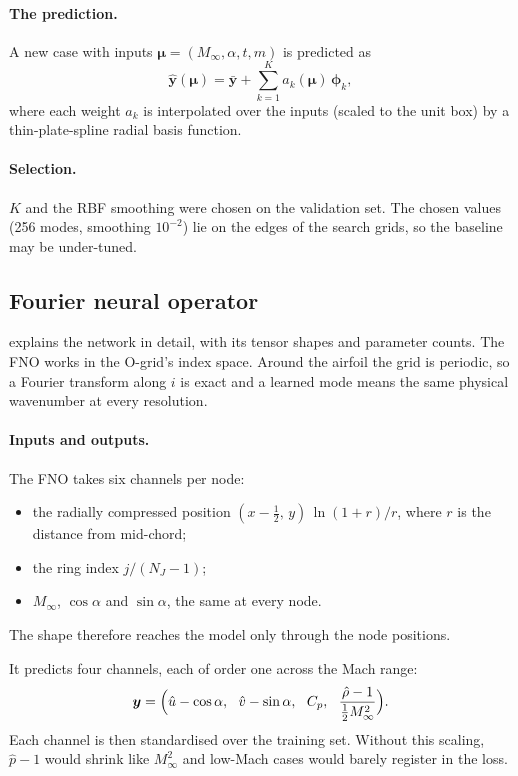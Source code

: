 \documentclass[11pt]{article}
\newcommand{\Ma}{M_\infty}
\newcommand{\Cp}{C_p}
\begin{document}
\paragraph{The prediction.}
A new case with inputs $\bm\mu = (\Ma,\alpha,t,m)$ is predicted as
\begin{equation}
  \hat{\bm y}(\bm\mu) = \bar{\bm y} + \sum_{k=1}^{K} a_k(\bm\mu)\,\bm\phi_k ,
\end{equation}
where each weight $a_k$ is interpolated over the inputs (scaled to the unit box) by a
thin-plate-spline radial basis function.

\paragraph{Selection.}
$K$ and the RBF smoothing were chosen on the validation set. The chosen values (256 modes,
smoothing $10^{-2}$) lie on the edges of the search grids, so the baseline may be under-tuned.

\subsection{Fourier neural operator}
\label{sec:fno}

 explains the network in detail, with its tensor shapes and parameter counts.
The FNO works in the O-grid's index space. Around the airfoil the grid is periodic, so a Fourier
transform along $i$ is exact and a learned mode means the same physical wavenumber at every
resolution.

\paragraph{Inputs and outputs.}
The FNO takes six channels per node:
\begin{itemize}
  \item the radially compressed position $(x - \tfrac12,\, y)\,\ln(1+r)/r$, where $r$ is the
    distance from mid-chord;
  \item the ring index $j/(N_J-1)$;
  \item $\Ma$, $\cos\alpha$ and $\sin\alpha$, the same at every node.
\end{itemize}
The shape therefore reaches the model only through the node positions.

It predicts four channels, each of order one across the Mach range:
\begin{equation}
  \bm y = \Bigl(\hat u - \cos\alpha,\ \ \hat v - \sin\alpha,\ \ \Cp,\ \
  \frac{\hat\rho - 1}{\tfrac12\Ma^2}\Bigr).
  \label{eq:targets}
\end{equation}
Each channel is then standardised over the training set. Without this scaling, $\hat p - 1$ would
shrink like $\Ma^2$ and low-Mach cases would barely register in the loss.
\end{document}
